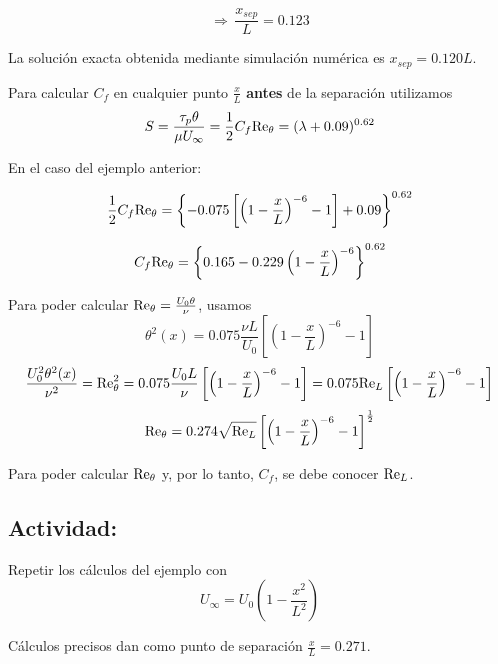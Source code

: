 		\[
		\Rightarrow\,\frac{x_{sep}}{L}=0.123
		\]
		
		La solución exacta obtenida mediante simulación numérica es $x_{sep}=0.120L$.

	
	Para calcular $C_{f}$ en cualquier punto $\frac{x}{L}$ \textbf{antes}
	de la separación utilizamos 
	\[
	S=\frac{\tau_{p}\theta}{\mu U_{\infty}}=\frac{1}{2}C_{f}\text{Re}_{\theta}=(\lambda+0.09)^{0.62}
	\]
	
	En el caso del ejemplo anterior:
	
	\[
	\frac{1}{2}C_{f}\text{Re}_{\theta}=\left\{ -0.075\left[\left(1-\frac{x}{L}\right)^{-6}-1\right]+0.09\right\} ^{0.62}
	\]
	
	\[
	C_{f}\text{Re}_{\theta}=\left\{ 0.165-0.229\left(1-\frac{x}{L}\right)^{-6}\right\} ^{0.62}
	\]
	
	
	Para poder calcular $\text{Re}_{\theta}=\frac{U_{0}\theta}{\nu}$, usamos
	\[
	\theta^{2}(x)=0.075\frac{\nu L}{U_{0}}\left[\left(1-\frac{x}{L}\right)^{-6}-1\right]
	\]
	{\footnotesize{}
		\[
		\frac{U_{0}^{2}\theta^{2}(x)}{\nu^{2}}=\text{Re}_{\theta}^{2}=0.075\frac{U_{0}L}{\nu}\left[\left(1-\frac{x}{L}\right)^{-6}-1\right]=0.075\text{Re}_{L}\left[\left(1-\frac{x}{L}\right)^{-6}-1\right]
		\]
	} 
	\[
	\text{Re}_{\theta}=0.274\sqrt{\text{Re}_{L}}\left[\left(1-\frac{x}{L}\right)^{-6}-1\right]^{\frac{1}{2}}
	\]
	
	Para poder calcular $\text{Re}_{\theta}$ y, por lo tanto, $C_{f}$, se
	debe conocer $\text{Re}_{L}$. 
	\subsection*{Actividad:}
		Repetir los cálculos del ejemplo con 
		\[
		U_{\infty}=U_{0}\left(1-\frac{x^{2}}{L^{2}}\right)
		\]
		
		Cálculos precisos dan como punto de separación $\frac{x}{L}=0.271$. 

